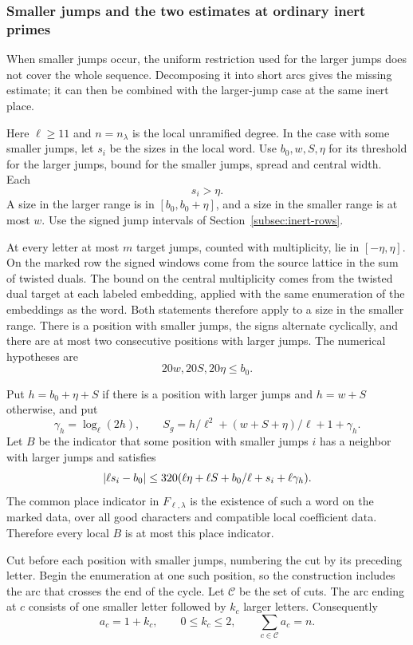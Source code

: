 \subsubsection{Smaller jumps and the two estimates at ordinary inert primes}
\label{sec:inert-row-table}
\hypertarget{source-inert-row-table}{}

When smaller jumps occur, the uniform restriction used for the larger jumps does not cover the whole sequence. Decomposing it into short arcs gives the missing estimate; it can then be combined with the larger-jump case at the same inert place.

Here \(\ell\ge11\) and \(n=n_\lambda\) is the local unramified degree. In the
case with some smaller jumps, let \(s_i\) be the sizes in the local word.
Use \(b_0,w,S,\eta\) for its threshold for the larger jumps, bound for the smaller jumps,
spread and central width. Each
\[
 s_i>\eta.
\]
A size in the larger range is
in \([b_0,b_0+\eta]\), and a size in the smaller range is at most \(w\).
Use the signed jump intervals of Section~\ref{subsec:inert-rows}.

At every letter at most \(m\)
target jumps, counted with multiplicity, lie in \([-\eta,\eta]\).
On the marked row the signed windows come from the source lattice
in the sum of twisted duals. The bound on the central multiplicity
comes from the twisted dual target at each labeled embedding,
applied with the same enumeration of the embeddings as the word.
Both statements therefore apply to a size in the smaller range.
\label{cor:inert-row-table-1}
There is a position with smaller jumps, the signs alternate cyclically,
and there are at most two consecutive positions with larger jumps.
The numerical hypotheses are
\[
 20w,20S,20\eta\le b_0.
\]

Put \(h=b_0+\eta+S\) if there is a position with larger jumps and \(h=w+S\)
otherwise, and put
\[
 \gamma_h=\log_\ell(2h),\qquad
 S_g=h/\ell^2+(w+S+\eta)/\ell+1+\gamma_h .
\]
Let \(B\) be the indicator that some position with smaller jumps \(i\)
has a neighbor with larger jumps and satisfies
\[
 \lvert\ell s_i-b_0\rvert\le 320
              (\ell\eta+\ell S+b_0/\ell+s_i+\ell\gamma_h).
\]
The common place indicator in \(F_{\ell,\lambda}\) is the
existence of such a word on the marked data, over all good
characters and compatible local coefficient data. Therefore every
local \(B\) is at most this place indicator.

Cut before each position with smaller jumps, numbering the cut by
its preceding letter. Begin the enumeration at one such position, so
the construction includes the arc that crosses the end of the cycle.
Let \(\mathcal C\) be the set of cuts. The arc ending at \(c\)
consists of one smaller letter followed by \(k_c\) larger letters.
Consequently
\[
 a_c=1+k_c,\qquad 0\le k_c\le2,\qquad
 \sum_{c\in\mathcal C}a_c=n .
\]

